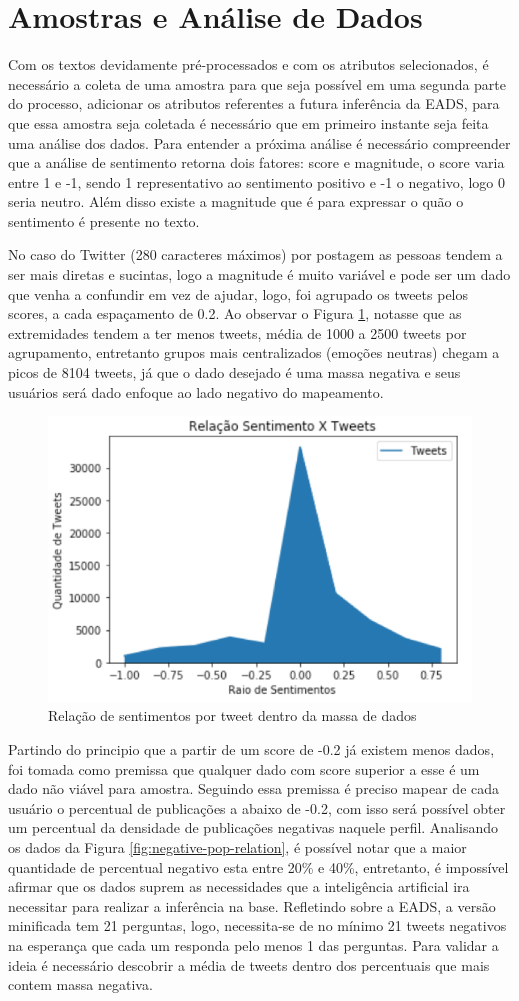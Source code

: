 \section{Amostras e Análise de Dados}
Com os textos devidamente pré-processados e com os atributos selecionados, é necessário a coleta de uma amostra para que seja possível em uma segunda parte do processo, adicionar os atributos referentes a futura inferência da EADS, para que essa amostra seja coletada é necessário que em primeiro instante seja feita uma análise dos dados. Para entender a próxima análise é necessário compreender que a análise de sentimento retorna dois fatores: score e magnitude, o score varia entre 1 e -1, sendo 1 representativo ao sentimento positivo e -1 o negativo, logo 0 seria neutro. Além disso existe a magnitude que é para expressar o quão o sentimento é presente no texto. 

No caso do Twitter (280 caracteres máximos) por postagem as pessoas tendem a ser mais diretas e sucintas, logo a magnitude é muito variável e pode ser um dado que venha a confundir em vez de ajudar, logo, foi agrupado os tweets pelos scores, a cada espaçamento de 0.2. Ao observar o Figura \ref{fig:sentiment-relation}, notasse que as extremidades tendem a ter menos tweets, média de 1000 a 2500 tweets por agrupamento, entretanto grupos mais centralizados (emoções neutras) chegam a picos de 8104 tweets, já que o dado desejado é uma massa negativa e seus usuários será dado enfoque ao lado negativo do mapeamento.

\begin{figure}
    \centering
    \includegraphics[width=.4\textwidth]{imagens/relacao-sentimento.png}
    \caption{Relação de sentimentos por tweet dentro da massa de dados}
    \label{fig:sentiment-relation}
\end{figure}


Partindo do principio que a partir de um score de -0.2 já existem menos dados, foi tomada como premissa que qualquer dado com score superior a esse é um dado não viável para amostra. Seguindo essa premissa é preciso mapear de cada usuário o percentual de publicações a abaixo de -0.2, com isso será possível obter um percentual da densidade de publicações negativas naquele perfil. Analisando os dados da Figura \ref{fig:negative-pop-relation}, é possível notar que a maior quantidade de percentual negativo esta entre 20\% e 40\%, entretanto, é impossível afirmar que os dados suprem as necessidades que a inteligência artificial ira necessitar para realizar a inferência na base. Refletindo sobre a EADS, a versão minificada tem 21 perguntas, logo, necessita-se de no mínimo 21 tweets negativos na esperança que cada um responda pelo menos 1 das perguntas. Para validar a ideia é necessário descobrir a média de tweets dentro dos percentuais que mais contem massa negativa.

